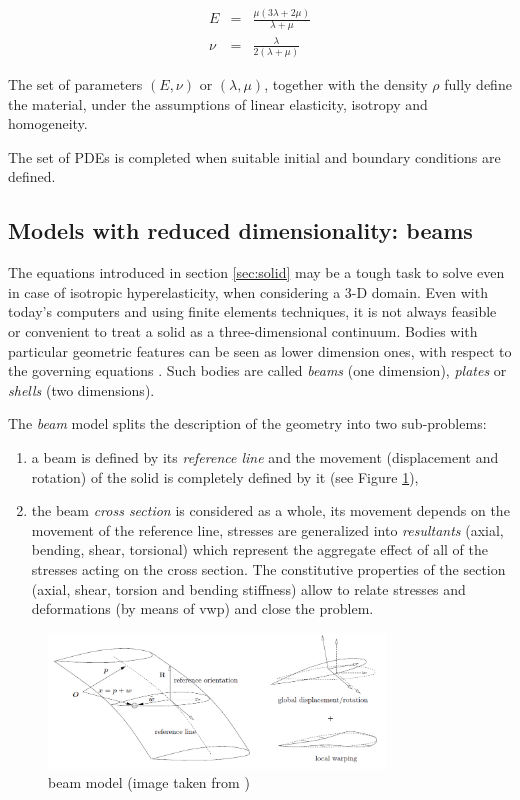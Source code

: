 \begin{eqnarray}
	E &=& \frac{\mu(3\lambda+2\mu)}{\lambda + \mu} \\
	\nu &=& \frac{\lambda}{2(\lambda + \mu)}
\end{eqnarray}

The set of parameters $\left(E, \nu\right)$ or $\left(\lambda, \mu \right)$, together with the density $\rho$ fully define the material, under the assumptions of linear elasticity, isotropy and homogeneity.

The set of PDEs is completed when suitable initial and boundary conditions are defined.

\subsection{Models with reduced dimensionality: beams}
\label{sec:beam}

The equations introduced in section \ref{sec:solid} may be a tough task to solve even in case of isotropic hyperelasticity, when considering a 3-D domain. Even with today's computers and using finite elements techniques, it is not always feasible or convenient to treat a solid as a three-dimensional continuum. Bodies with particular geometric features can be seen as lower dimension ones, with respect to the governing equations \cite{hjelmstad2007fundamentals}. Such bodies are called \textit{beams} (one dimension), \textit{plates} or \textit{shells} (two dimensions).

The \textit{beam} model splits the description of the geometry into two sub-problems:
\begin{enumerate}
	\item a beam is defined by its \textit{reference line} and the movement (displacement and rotation) of the solid is completely defined by it (see Figure \ref{fig:beam-model}),
	\item the beam \textit{cross section} is considered as a whole, its movement depends on the movement of the reference line, stresses are generalized into \textit{resultants} (axial, bending, shear, torsional) which represent the aggregate effect of all of the stresses acting on the cross section. The constitutive properties of the section (axial, shear, torsion and bending stiffness) allow to relate stresses and deformations (by means of \acrshort{vwp}) and close the problem.
\end{enumerate}


\begin{figure}[htbp!]
	\centering
	\includegraphics[width=0.8\textwidth]{images/beam}
	\caption{beam model (image taken from \cite{ghiringhelli2008integrated})}
	\label{fig:beam-model}
\end{figure}


